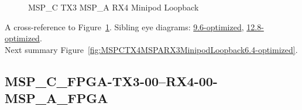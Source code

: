 \begin{figure}[h]
\begin{subfigure}{0.33\textwidth}
\hyperref[sec:MSPCFPGATX306RX406MSPAFPGA6.4-optimized]{}
\end{subfigure}\hspace*{\fill}
\begin{subfigure}{0.33\textwidth}
\hyperref[sec:MSPCFPGATX307RX407MSPAFPGA6.4-optimized]{}
\end{subfigure}\hspace*{\fill}
\begin{subfigure}{0.33\textwidth}
\hyperref[sec:MSPCFPGATX308RX408MSPAFPGA6.4-optimized]{}
\end{subfigure}

\begin{subfigure}{0.33\textwidth}
\hyperref[sec:MSPCFPGATX309RX409MSPAFPGA6.4-optimized]{}
\end{subfigure}\hspace*{\fill}
\begin{subfigure}{0.33\textwidth}
\hyperref[sec:MSPCFPGATX310RX410MSPAFPGA6.4-optimized]{}
\end{subfigure}\hspace*{\fill}
\begin{subfigure}{0.33\textwidth}
\hyperref[sec:MSPCFPGATX311RX411MSPAFPGA6.4-optimized]{}
\end{subfigure}

\caption{MSP\_C TX3 MSP\_A RX4 Minipod Loopback} \label{fig:MSPCTX3MSPARX4MinipodLoopback6.4-optimized}
\end{figure}

A cross-reference to Figure~\ref{fig:MSPCTX3MSPARX4MinipodLoopback6.4-optimized}.
Sibling eye diagrams: \hyperref[sec:MSPCTX3MSPARX4MinipodLoopback9.6-optimized]{9.6-optimized}, \hyperref[sec:MSPCTX3MSPARX4MinipodLoopback12.8-optimized]{12.8-optimized}. \\
Next summary Figure~\ref{fig:MSPCTX4MSPARX3MinipodLoopback6.4-optimized}.
\clearpage
% 
\subsection{MSP\_C\_FPGA-TX3-00--RX4-00-MSP\_A\_FPGA}\label{sec:MSPCFPGATX300RX400MSPAFPGA6.4-optimized}

